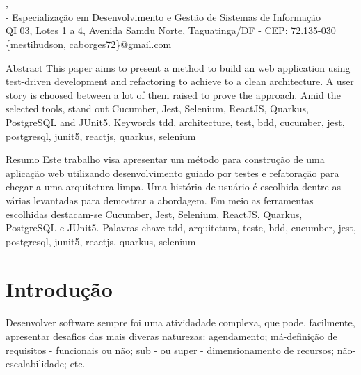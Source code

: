 


  
  
  




  \clearpage

  \thispagestyle{empty}

  \begin{center}
    \titulo\\
    \subtitulo\\
    \autor, \orientador\\
    \instituicao - Especialização em Desenvolvimento e Gestão de Sistemas de
    Informação\\
    QI 03, Lotes 1 a 4, Avenida Samdu Norte, Taguatinga/DF - CEP: 72.135-030\\
    \{mestihudson, caborges72\}@gmail.com
  \end{center}

  \resumo
    {Abstract}
    {This paper aims to present a method to build an web application using test-driven development and refactoring to achieve to a clean architecture. A user story is choosed between a lot of them raised to prove the approach. Amid the selected tools, stand out Cucumber, Jest, Selenium, ReactJS, Quarkus, PostgreSQL and JUnit5.}
    {Keywords}
    {tdd, architecture, test, bdd, cucumber, jest, postgresql, junit5, reactjs, quarkus, selenium}

  \resumo
    {Resumo}
    {Este trabalho visa apresentar um método para construção de uma aplicação web utilizando desenvolvimento guiado por testes e refatoração para chegar a uma arquitetura limpa. Uma história de usuário é escolhida dentre as várias levantadas para demostrar a abordagem. Em meio as ferramentas escolhidas destacam-se Cucumber, Jest, Selenium, ReactJS, Quarkus, PostgreSQL e JUnit5.}
    {Palavras-chave}
    {tdd, arquitetura, teste, bdd, cucumber, jest, postgresql, junit5, reactjs, quarkus, selenium}

  \section{Introdução}

    Desenvolver software sempre foi uma atividadade complexa, que pode, facilmente,  apresentar desafios das mais diveras naturezas: agendamento; má-definição de  requisitos - funcionais ou não; sub - ou super - dimensionamento de recursos; não-escalabilidade; etc.


